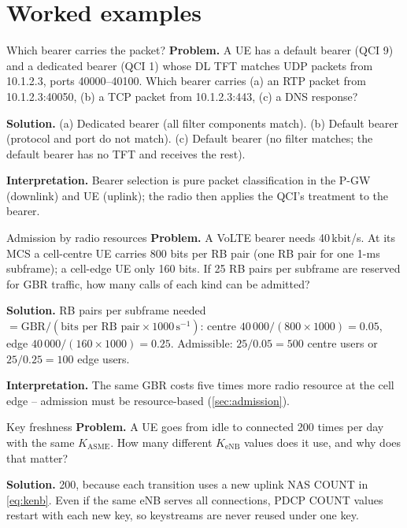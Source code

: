 \documentclass[11pt,a4paper]{article}
\begin{document}
\begin{acnfigure}
  \caption{Dedicated bearer activation triggered by policy (\cref{proc:ded}).}
  \label{fig:dedicated}
\end{acnfigure}

\section{Worked examples}

\begin{examplebox}{Which bearer carries the packet?}\label{ex:tft}
\textbf{Problem.} A UE has a default bearer (QCI 9) and a dedicated bearer (QCI 1) whose DL TFT matches
UDP packets from 10.1.2.3, ports 40000--40100. Which bearer carries (a) an RTP packet from 10.1.2.3:40050,
(b) a TCP packet from 10.1.2.3:443, (c) a DNS response?

\textbf{Solution.} (a) Dedicated bearer (all filter components match). (b) Default bearer (protocol and
port do not match). (c) Default bearer (no filter matches; the default bearer has no TFT and receives
the rest).

\textbf{Interpretation.} Bearer selection is pure packet classification in the P-GW (downlink) and UE
(uplink); the radio then applies the QCI's treatment to the bearer.
\end{examplebox}

\begin{examplebox}{Admission by radio resources}\label{ex:rbadm}
\textbf{Problem.} A VoLTE bearer needs 40\,kbit/s. At its MCS a cell-centre UE carries 800 bits per RB pair
(one RB pair for one 1-ms subframe); a cell-edge UE only 160 bits. If 25 RB pairs per subframe are reserved for
GBR traffic, how many calls of each kind can be admitted?

\textbf{Solution.} RB pairs per subframe needed $= \mathrm{GBR}/(\text{bits per RB pair}\times1000\,\mathrm{s}^{-1})$:
centre $40\,000/(800\times1000) = 0.05$, edge $40\,000/(160\times1000) = 0.25$. Admissible: $25/0.05 =
500$ centre users or $25/0.25 = 100$ edge users.

\textbf{Interpretation.} The same GBR costs five times more radio resource at the cell edge -- admission
must be resource-based (\cref{sec:admission}).
\end{examplebox}

\begin{examplebox}{Key freshness}\label{ex:fresh}
\textbf{Problem.} A UE goes from idle to connected 200 times per day with the same $K_{\mathrm{ASME}}$.
How many different $K_{\mathrm{eNB}}$ values does it use, and why does that matter?

\textbf{Solution.} 200, because each transition uses a new uplink NAS COUNT in \cref{eq:kenb}. Even if the
same eNB serves all connections, PDCP COUNT values restart with each new key, so keystreams are never
reused under one key.
\end{examplebox}
\end{document}
